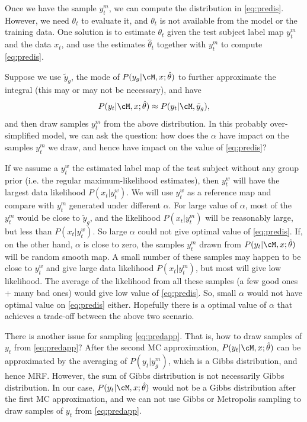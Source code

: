 \documentclass[12pt]{article}
\begin{document}
Once we have the sample $y_t^m$, we can compute the distribution in
\eqref{eq:predis}. However, we need $\theta_t$ to evaluate it, and $\theta_t$ is
not available from the model or the training data. One solution is to estimate
$\theta_t$ given the test subject label map $y_t^m$ and the data $x_t$, and use
the estimates $\hat \theta_t$ together with $y_t^m$ to compute
\eqref{eq:predis}.

Suppose we use $\tilde y_g$, the mode of $P(y_g | \cM, x; \hat \theta)$ to
further approximate the integral (this may or may not be necessary), and have
\[
P(y_t|\cM, x; \hat \theta)  \approx P(y_t | \cM, \tilde y_g),
\]
and then draw samples $y_t^m$ from the above distribution. In this probably
over-simplified model, we can ask the question: how does the $\alpha$ have
impact on the samples $y_t^m$ we draw, and hence have impact on the value of
\eqref{eq:predis}? 

If we assume a $y_t^w$ the estimated label map of the test subject without any
group prior (i.e. the regular maximum-likelihood estimates), then $y_t^w$ will
have the largest data likelihood $P(x_t | y_t^w)$. We will use $y_t^w$ as a
reference map and compare with $y_t^m$ generated under different $\alpha$. For
large value of $\alpha$, most of the $y_t^m$ would be close to $\tilde y_g$, and
the likelihood $P(x_t | y_t^m)$ will be reasonably large, but less than $P(x_t |
y_t^w)$. So large $\alpha$ could not give optimal value of
\eqref{eq:predis}. If, on the other hand, $\alpha$ is close to zero, the samples
$y_t^m$ drawn from $P(y_t|\cM, x; \hat \theta)$ will be random smooth map. A
small number of these samples may happen to be close to $y_t^w$ and give large
data likelihood $P(x_t | y_t^m)$, but most will give low likelihood. The average
of the likelihood from all these samples (a few good ones + many bad ones) would
give low value of \eqref{eq:predis}. So, small $\alpha$ would not have optimal
value on \eqref{eq:predis} either. Hopefully there is a optimal value of
$\alpha$ that achieves a trade-off between the above two scenario.

There is another issue for sampling \eqref{eq:predapp}. That is, how to draw
samples of $y_t$ from \eqref{eq:predapp}? After the second MC approximation,
$P(y_t|\cM, x; \hat \theta)$ can be approximated by the averaging of
$P(y_t|y_g^m)$, which is a Gibbs distribution, and hence MRF. However, the sum of
Gibbs distribution is not necessarily Gibbs distribution. In our case,
$P(y_t|\cM, x; \hat \theta)$ would not be a Gibbs distribution after the first
MC approximation, and we can not use Gibbs or Metropolis sampling to draw
samples of $y_t$ from \eqref{eq:predapp}.
\end{document}
